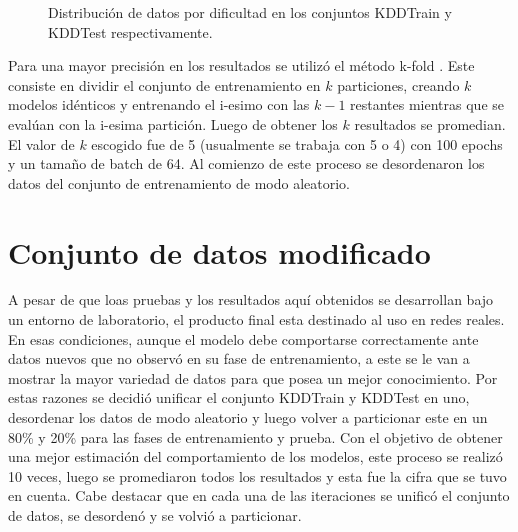 \begin{figure}
    \centering

    \caption{Distribución de datos por dificultad en los conjuntos KDDTrain y KDDTest respectivamente.}
    \label{fig:diff_distribution}
\end{figure}

Para una mayor precisión en los resultados se utilizó el método k-fold \cite{10.5555/3203489}. Este consiste en dividir el conjunto de entrenamiento en $k$ particiones, creando $k$ modelos idénticos y entrenando el i-esimo con las $k - 1$ restantes mientras que se evalúan con la i-esima partición. Luego de obtener los $k$ resultados se promedian. El valor de $k$ escogido fue de 5 (usualmente se trabaja con 5 o 4) con 100 epochs y un tamaño de batch de 64. Al comienzo de este proceso se desordenaron los datos del conjunto de entrenamiento de modo aleatorio.

\section{Conjunto de datos modificado}
A pesar de que loas pruebas y los resultados aquí obtenidos se desarrollan bajo un entorno de laboratorio, el producto final esta destinado al uso en redes reales. En esas condiciones, aunque el modelo debe comportarse correctamente ante datos nuevos que no observó en su fase de entrenamiento, a este se le van a mostrar la mayor variedad de datos para que posea un mejor conocimiento. Por estas razones se decidió unificar el conjunto KDDTrain y KDDTest en uno, desordenar los datos de modo aleatorio y luego volver a particionar este en un 80\% y 20\% para las fases de entrenamiento y prueba. Con el objetivo de obtener una mejor estimación del comportamiento de los modelos, este proceso se realizó 10 veces, luego se promediaron todos los resultados y esta fue la cifra que se tuvo en cuenta. Cabe destacar que en cada una de las iteraciones se unificó el conjunto de datos, se desordenó y se volvió a particionar.